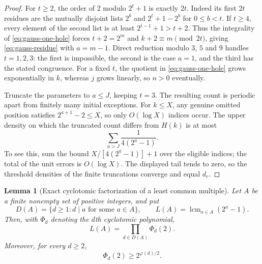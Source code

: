 \documentclass[11pt,a4paper]{article}
\newtheorem{lemma}[theorem]{Lemma}
\theoremstyle{definition}
\theoremstyle{remark}\newtheorem{remark}[theorem]{Remark}
\begin{document}
\begin{proof}
For $t\geq2$, the order of $2$ modulo $2^t+1$ is exactly $2t$.
Indeed its first $2t$ residues are the mutually disjoint lists
$2^b$ and $2^t+1-2^b$ for $0\leq b<t$.
If $t\geq4$, every element of the second list is at least
$2^{t-1}+1>t+2$.  Thus the integrality of
\eqref{eq:gauss-one-hole} forces $t+2=2^m$ and
$k+2\equiv m\pmod{2t}$, giving \eqref{eq:gauss-residue}
with $a=m-1$.  Direct reduction modulo $3$, $5$ and $9$
handles $t=1,2,3$: the first is impossible, the second is the case
$a=1$, and the third has the stated congruence.  For a fixed $t$, the
quotient in \eqref{eq:gauss-one-hole} grows exponentially in $k$,
whereas $j$ grows linearly, so $n>0$ eventually.

Truncate the parameters to $a\leq J$, keeping $t=3$.  The resulting
count is periodic apart from finitely many initial exceptions.  For $k\leq X$,
any genuine omitted position satisfies $2^{a+1}-2\leq X$, so only
$O(\log X)$ indices occur.  The upper density on which the truncated
count differs from $H(k)$ is at most
\[
 \sum_{a>J}\frac{1}{4(2^a-1)}.
\]
To see this, sum the bound $X/[4(2^a-1)]+1$ over the eligible indices;
the total of the unit errors is $O(\log X)$.  The displayed tail tends
to zero, so the threshold densities of the finite truncations converge
and equal $d_r$.
\end{proof}

\begin{lemma}[Exact cyclotomic factorization of a least common multiple]
\label{lem:gauss-cyclotomic}
Let $A$ be a finite nonempty set of positive integers, and put
\[
 D(A)=\{d\geq1:d\mid a\text{ for some }a\in A\},\qquad
 L(A)=\operatorname{lcm}_{a\in A}(2^a-1).
\]
Then, with $\Phi_d$ denoting the $d$th cyclotomic polynomial,
\begin{equation}\label{eq:gauss-exact-lcm}
 L(A)=\prod_{d\in D(A)}\Phi_d(2).
\end{equation}
Moreover, for every $d\geq2$,
\begin{equation}\label{eq:gauss-cyclotomic-lower}
 \Phi_d(2)\geq2^{\varphi(d)/2}.
\end{equation}
\end{lemma}
\end{document}

